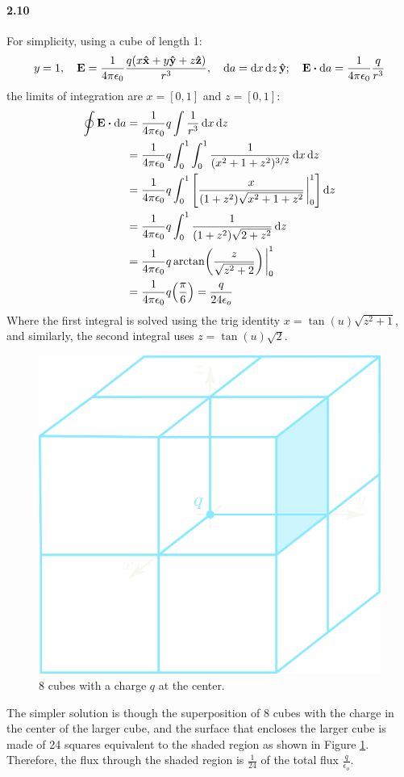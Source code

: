 \documentclass[../main.tex]{subfiles}
\begin{document}
\paragraph{2.10}
For simplicity, using a cube of length 1:
\begin{align*}
    y = 1 ,\quad \vb{E} = \ke \frac{q(x\vu{x} + y\vu{y} + z\vu{z})}{r^3}
    ,\quad \dd{a} = \dd{x} \dd{z} \vu{y} ;\quad \vb{E} \vdot \dd{a} = \ke \frac{q}{r^3}
\end{align*}
the limits of integration are $x = [0,1]$ and $z = [0,1]$:
\begin{align*}
    \oint \vb{E} \vdot \dd{a} &=\ke q \int \frac{1}{r^3} \dd{x} \dd{z} \\
    &= \ke q \int_0^1 \int_0^1 \frac{1}{(x^2 + 1 + z^2)^{3/2}} \dd{x} \dd{z} \\
    &= \ke q \int_0^1 \qt[
        \frac{x}{(1+z^2) \sqrt{x^2 + 1 + z^2}} \eval_0^1 
    ] \dd{z} \\
    &= \ke q \int_0^1 \frac{1}{(1 + z^2) \sqrt{2 + z^2}} \dd{z} \\
    &= \ke q \arctan(\frac{z}{\sqrt{z^2 + 2}}) \eval_0^1 \\
    &= \ke q \qt(\frac{\pi}{6}) = \frac{q}{24\epsilon_o}
\end{align*}
Where the first integral is solved using the trig identity $x = \tan(u) \sqrt{z^2 + 1}$, and 
similarly, the second integral uses $z = \tan(u) \sqrt{2}$.

\begin{figure}[ht]
    \centering
    \includegraphics[width=0.5\linewidth]{images/fig2_10.png}
    \captionsetup{width=0.8\linewidth}
    \caption{8 cubes with a charge $q$ at the center.}
    \label{fig:2_10}
\end{figure}
The simpler solution is though the superposition of 8 cubes with the charge in the center of the
larger cube, and the surface that encloses the larger cube is made of 24 squares equivalent to the
shaded region as shown in Figure \ref{fig:2_10}. Therefore, the flux through the shaded region is
$\frac{1}{24}$ of the total flux $\frac{q}{\epsilon_o}$.
\end{document}
